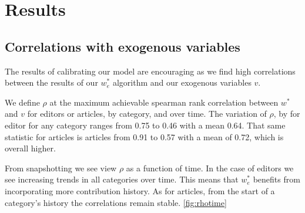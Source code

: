 \documentclass{acm_proc_article-sp}
\begin{document}
\section{Results}


\subsection{Correlations with exogenous variables}

The results of calibrating our model are encouraging as we find high correlations between the results of our $w^*_e$ algorithm and our exogenous variables $v$. 

We define $\rho$ at the maximum achievable spearman rank correlation between $w^*$ and $v$ for editors or articles, by category, and over time. The variation of $\rho$, by for editor for any category ranges from 0.75 to 0.46 with a mean 0.64.  That same statistic for articles is articles from 0.91 to 0.57 with a mean of 0.72, which is overall higher.

 
From snapshotting we see view $\rho$ as  a function of time. In the case of editors we see increasing trends in all categories over time. This means that $w^*_e$ benefits from incorporating more contribution history. As for articles, from the start of a category's history the correlations remain stable. \ref{fig:rhotime}
\end{document}
